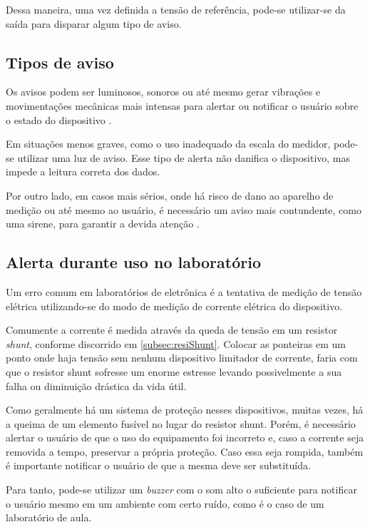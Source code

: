 Dessa maneira, uma vez definida a tensão de referência, pode-se utilizar-se da saída para disparar algum tipo de aviso.

\subsection{Tipos de aviso} \label{subsec:tiposdeaviso}

Os avisos podem ser luminosos, sonoros ou até mesmo gerar vibrações e movimentações mecânicas mais intensas para alertar ou notificar o usuário sobre o estado do dispositivo \cite{base_alarms}.

Em situações menos graves, como o uso inadequado da escala do medidor, pode-se utilizar uma luz de aviso. Esse tipo de alerta não danifica o dispositivo, mas impede a leitura correta dos dados.

Por outro lado, em casos mais sérios, onde há risco de dano ao aparelho de medição ou até mesmo ao usuário, é necessário um aviso mais contundente, como uma sirene, para garantir a devida atenção \cite{base_alarms}.

\subsection{Alerta durante uso no laboratório} \label{subsec:casosextrgraves}

Um erro comum em laboratórios de eletrônica é a tentativa de medição de tensão elétrica utilizando-se do modo de medição de corrente elétrica do dispositivo.

Comumente a corrente é medida através da queda de tensão em um resistor \textit{shunt}, conforme discorrido em \ref{subsec:resiShunt}. Colocar as ponteiras em um ponto onde haja tensão sem nenhum dispositivo limitador de corrente, faria com que o resistor shunt sofresse um enorme estresse levando possivelmente a sua falha ou diminuição drástica da vida útil.

Como geralmente há um sistema de proteção nesses dispositivos, muitas vezes, há a queima de um elemento fusível no lugar do resistor shunt. Porém, é necessário alertar o usuário de que o uso do equipamento foi incorreto e, caso a corrente seja removida a tempo, preservar a própria proteção. Caso essa seja rompida, também é importante notificar o usuário de que a mesma deve ser substituída.

Para tanto, pode-se utilizar um \textit{buzzer} com o som alto o suficiente para notificar o usuário mesmo em um ambiente com certo ruído, como é o caso de um laboratório de aula.

